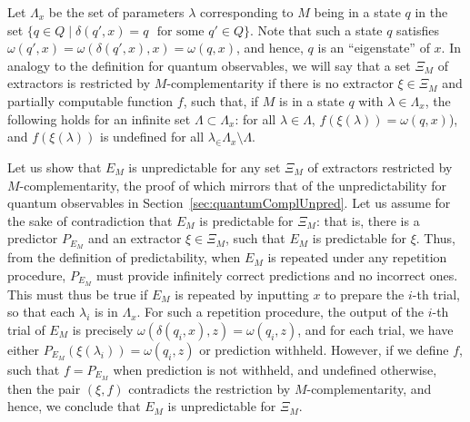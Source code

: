 \documentclass[information,article,accept,moreauthors,pdftex,12pt,a4paper]{mdpi}
\theoremstyle{mdpi}
\newcounter{ex}
\newcounter{re}
\theoremstyle{mdpidefinition}
\begin{document}
Let $\Lambda_x$ be the set of parameters $\lambda$ corresponding to $M$ being in a state $q$ in the set $\{q\in Q\mid \delta(q',x)=q$ $\text{ for some $q'\in Q$}\}$.
Note that such a state $q$ satisfies $\omega(q',x)=\omega(\delta(q',x),x)=\omega(q,x)$, and hence, $q$ is an ``eigenstate'' of $x$.
In analogy to the definition for quantum observables, we will say that a set $\Xi_M$ of extractors is {restricted by $M$-complementarity} if there is no extractor $\xi\in\Xi_M$ and partially computable function $f$, such that, if $M$ is in a state $q$ with $\lambda\in\Lambda_x$, the following holds for an infinite set $\Lambda\subset\Lambda_x$: for all $\lambda\in\Lambda$, $f(\xi(\lambda))=\omega(q,x)$), and $f(\xi(\lambda))$ is undefined for all $\lambda_\in\Lambda_x\setminus\Lambda$.

Let us show that $E_M$ is unpredictable for any set $\Xi_M$ of extractors restricted by $M$-complementarity, the proof of which mirrors that of the unpredictability for quantum observables in Section~\ref{sec:quantumComplUnpred}.
Let us assume for the sake of contradiction that $E_M$ is predictable for $\Xi_M$: that is, there is a predictor $P_{E_M}$ and an extractor $\xi\in\Xi_M$, such that $E_M$ is predictable for $\xi$.
Thus, from the definition of predictability, when $E_M$ is repeated under any repetition procedure, $P_{E_M}$ must provide infinitely correct predictions and no incorrect ones.
This must thus be true if $E_M$ is repeated
by inputting $x$ to prepare the $i$-th trial, %
so that each $\lambda_i$ is in $\Lambda_x$.
For such a repetition procedure, the output of the $i$-th trial of $E_M$ is precisely $\omega(\delta(q_i,x),z)=\omega(q_i,z)$, and for each trial, we have either $P_{E_M}(\xi(\lambda_i))=\omega(q_i,z)$ or prediction withheld.
However, if we define $f$, such that $f=P_{E_M}$ when prediction is not withheld, and undefined otherwise, then the pair $(\xi,f)$ contradicts the restriction by
$M$-complementarity, and hence, we conclude that $E_M$ is unpredictable for $\Xi_M$.
\end{document}
